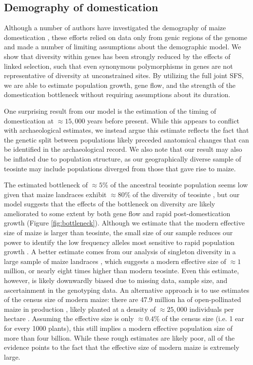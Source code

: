 \documentclass{pnastwo}
\begin{document}
\begin{article}
\subsection{Demography of domestication}
Although a number of authors have investigated the demography of maize domestication \cite{eyre1998, tenaillon2004selection, wright2005}, these  efforts relied on data only from genic regions of the genome and made a number of limiting assumptions about the demographic model.  
We show that diversity within genes has been strongly reduced by the effects of linked selection, such that even synonymous polymorphisms in genes are not representative of diversity at unconstrained sites.  
By utilizing the full joint SFS, we are able to estimate population growth, gene flow, and the strength of the domestication bottleneck without requiring assumptions about its duration.  

One surprising result from our model is the estimation of the timing of domestication at $\approx 15,000$ years before present.
While this appears to conflict with archaeological \cite{piperno2009starch} estimates, we instead argue this estimate reflects the fact that the genetic split between populations likely preceded anatomical changes that can be identified in the archaeological record. 
We also note that our result may also be inflated due to population structure, as our geographically diverse sample of teosinte may include populations diverged from those that gave rise to maize.

The estimated bottleneck of $\approx 5\%$ of the ancestral teosinte population seems low given that maize landraces exhibit $\approx 80\%$ of the diversity of teosinte \citep{hufford2012}, but our model suggests that the effects of the bottleneck on diversity are likely ameliorated to some extent by both gene flow and rapid post-domestication growth (Figure \ref{fig:bottleneck}).   
Although we estimate that the modern effective size of maize is larger than teosinte, the small size of our sample reduces our power to identify the low frequency alleles most sensitive to rapid population growth \cite{keinan2012}.  
A better estimate comes from our analysis of singleton diversity in a large sample of maize landraces \cite{Hearne2015}, which suggests a modern effective size of $\approx 1$ million, or nearly eight times higher than modern teosinte.
Even this estimate, however, is likely downwardly biased due to missing data, sample size, and ascertainment in the genotyping data.
An alternative approach is to use estimates of the census size of modern maize: there are 47.9 million ha of open-pollinated maize in production \cite{cimmyt1999}, likely planted at a density of $\approx 25,000$ individuals  per hectare \cite{baden2001culture}.
Assuming the effective size is only $\approx 0.4\%$ of the census size (i.e. 1 ear for every 1000 plants), this still implies a modern effective population size of more than four billion.
While these rough estimates are likely poor, all of the evidence points to the fact that the effective size of modern maize is extremely large.


\end{article}
\end{document}
